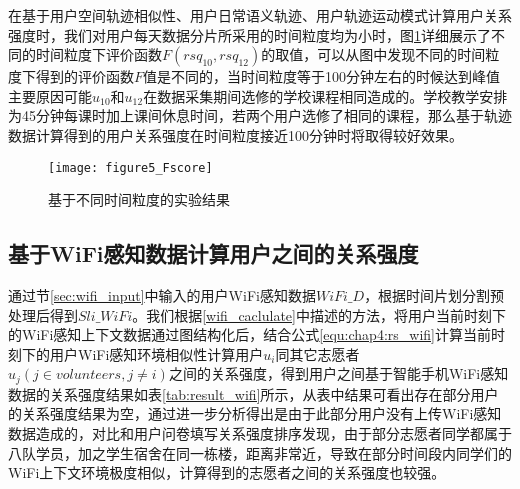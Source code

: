 \par 在基于用户空间轨迹相似性、用户日常语义轨迹、用户轨迹运动模式计算用户关系强度时，我们对用户每天数据分片所采用的时间粒度均为小时，图\ref{fig:timeslice}详细展示了不同的时间粒度下评价函数$F(rsq_{10},rsq_{12})$的取值，可以从图中发现不同的时间粒度下得到的评价函数$F$值是不同的，当时间粒度等于100分钟左右的时候达到峰值主要原因可能$u_{10}$和$u_{12}$在数据采集期间选修的学校课程相同造成的。学校教学安排为45分钟每课时加上课间休息时间，若两个用户选修了相同的课程，那么基于轨迹数据计算得到的用户关系强度在时间粒度接近100分钟时将取得较好效果。
\begin{figure}[htb]
\centering
\texttt{[image: figure5\_Fscore]}
\caption{基于不同时间粒度的实验结果}
\label{fig:timeslice}
\end{figure}

\subsection{基于WiFi感知数据计算用户之间的关系强度}
通过节\ref{sec:wifi_input}中输入的用户WiFi感知数据$WiFi\_D$，根据时间片划分割预处理后得到$Sli\_WiFi$。我们根据\ref{wifi_caclulate}中描述的方法，将用户当前时刻下的WiFi感知上下文数据通过图结构化后，结合公式\ref{equ:chap4:rs_wifi}计算当前时刻下的用户WiFi感知环境相似性计算用户$u_{i}$同其它志愿者$u_{j}(j \in volunteers, j \neq i)$之间的关系强度，得到用户之间基于智能手机WiFi感知数据的关系强度结果如表\ref{tab:result_wifi}所示，从表中结果可看出存在部分用户的关系强度结果为空，通过进一步分析得出是由于此部分用户没有上传WiFi感知数据造成的，对比和用户问卷填写关系强度排序发现，由于部分志愿者同学都属于八队学员，加之学生宿舍在同一栋楼，距离非常近，导致在部分时间段内同学们的WiFi上下文环境极度相似，计算得到的志愿者之间的关系强度也较强。
